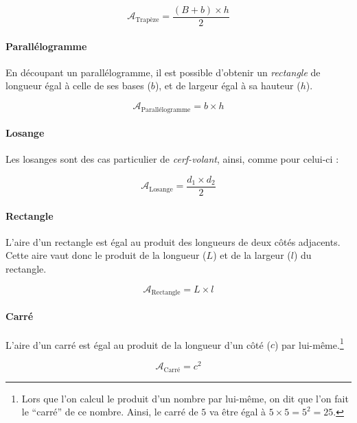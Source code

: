 \documentclass[a4paper, twoside]{article}
\begin{document}
$$\mathcal{A}_{\text{Trapèze}} = \frac {(B+b) \times h}{2}$$

\vspace*{-0.25cm}

\paragraph*{Parallélogramme}

En découpant un parallélogramme,
il est possible d'obtenir un \textit{rectangle} de longueur égal à celle de ses bases ($b$),
et de largeur égal à sa hauteur ($h$).

$$\mathcal{A}_{\text{Parallélogramme}} = b \times h$$

\vspace*{-0.25cm}

\paragraph*{Losange}

Les losanges sont des cas particulier de \textit{cerf-volant},
ainsi, comme pour celui-ci :

$$\mathcal{A}_{\text{Losange}} = \frac{ d_{1} \times d_{2} }{ 2 }$$

\vspace*{-0.25cm}

\paragraph*{Rectangle}

L'aire d'un rectangle est égal au produit des longueurs de deux
côtés adjacents. Cette aire vaut donc le produit de la
longueur ($L$) et de la largeur ($l$) du rectangle.

$$\mathcal{A}_{\text{Rectangle}} = L \times l$$

\vspace*{-0.25cm}

\paragraph*{Carré}

L'aire d'un carré est égal au produit de la longueur d'un côté
($c$) par lui-même.\footnote{Lors que l'on calcul le produit d'un nombre
	par lui-même, on dit que l'on fait le “carré” de ce nombre.
	Ainsi, le carré de $5$ va être égal à $5 \times 5 = 5^{2} = 25$.}

$$\mathcal{A}_{\text{Carré}} = c^{2}$$
\end{document}
